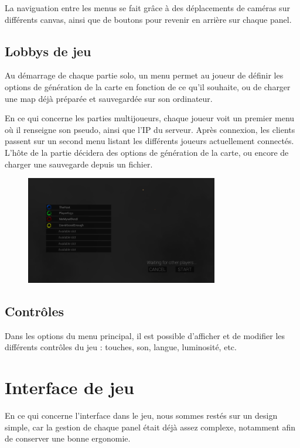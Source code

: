 \documentclass[12pt]{report}
\begin{document}
La naviguation entre les menus se fait grâce à des déplacements de caméras sur
différents canvas, ainsi que de boutons pour revenir en arrière sur chaque
panel.

\subsection{Lobbys de jeu}

Au démarrage de chaque partie solo, un menu permet au joueur de définir les
options de génération de la carte en fonction de ce qu’il souhaite, ou de
charger une map déjà préparée et sauvegardée sur son ordinateur.

En ce qui concerne les parties multijoueurs, chaque joueur voit un premier menu
où il renseigne son pseudo, ainsi que l'IP du serveur. Après connexion, les
clients passent sur un second menu listant les différents joueurs actuellement
connectés. L'hôte de la partie décidera des options de génération de la carte,
ou encore de charger une sauvegarde depuis un fichier.

\begin{figure}[H]
    \centering
    \includegraphics[width=0.75\textwidth]{multiplayer_lobby}
\end{figure}

\subsection{Contrôles}

Dans les options du menu principal, il est possible d’afficher et de modifier
les différents contrôles du jeu : touches, son, langue, luminosité, etc.

\section{Interface de jeu}

En ce qui concerne l’interface dans le jeu, nous sommes restés sur un design
simple, car la gestion de chaque panel était déjà assez complexe, notamment afin
de conserver une bonne ergonomie.
\end{document}
